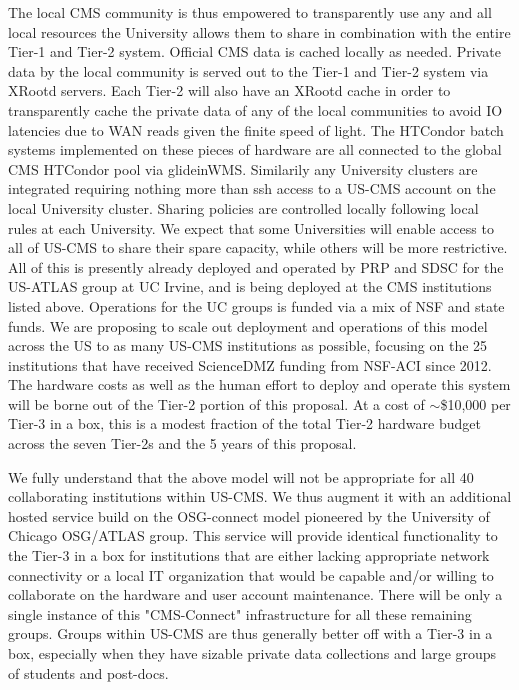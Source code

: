 \documentclass[11pt,a4paper]{article}
\begin{document}
The local CMS community is thus empowered to transparently use any and
all local resources the University allows them to share in combination
with the entire Tier-1 and Tier-2 system. Official CMS data is cached
locally as needed. Private data by the local community is served out
to the Tier-1 and Tier-2 system via XRootd servers. Each Tier-2 will
also have an XRootd cache in order to transparently cache the private
data of any of the local communities to avoid IO latencies due to WAN
reads given the finite speed of light.  The HTCondor batch systems
implemented on these pieces of hardware are all connected to the
global CMS HTCondor pool via glideinWMS. Similarily any University
clusters are integrated requiring nothing more than ssh access to a
US-CMS account on the local University cluster. Sharing policies are
controlled locally following local rules at each University. We expect
that some Universities will enable access to all of US-CMS to share
their spare capacity, while others will be more restrictive. All of
this is presently already deployed and operated by PRP and SDSC for
the US-ATLAS group at UC Irvine, and is being deployed at the CMS
institutions listed above. Operations for the UC groups is funded via
a mix of NSF and state funds. We are proposing to scale out deployment
and operations of this model across the US to as many US-CMS
institutions as possible, focusing on the 25 institutions that have
received ScienceDMZ funding from NSF-ACI since 2012. The hardware
costs as well as the human effort to deploy and operate this system
will be borne out of the Tier-2 portion of this proposal. At a cost of
$\sim$\$10,000 per Tier-3 in a box, this is a modest fraction of the
total Tier-2 hardware budget across the seven Tier-2s and the 5 years
of this proposal.

We fully understand that the above model will not be appropriate for
all 40 collaborating institutions within US-CMS. We thus augment it
with an additional hosted service build on the OSG-connect model
pioneered by the University of Chicago OSG/ATLAS group.  This service
will provide identical functionality to the Tier-3 in a box for
institutions that are either lacking appropriate network connectivity
or a local IT organization that would be capable and/or willing to
collaborate on the hardware and user account maintenance.  There will
be only a single instance of this "CMS-Connect" infrastructure for all
these remaining groups. Groups within US-CMS are thus generally better
off with a Tier-3 in a box, especially when they have sizable private
data collections and large groups of students and post-docs. 
\end{document}
